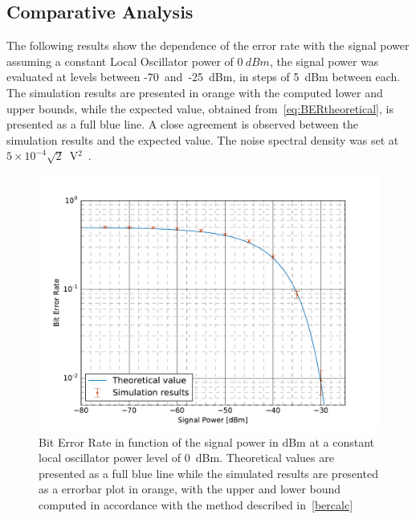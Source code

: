 \subsection{Comparative Analysis}

The following results show the dependence of the error rate with the signal power assuming a constant Local Oscillator power of $0~dBm$, the signal power was evaluated at levels between -70~and~-25~dBm, in steps of 5~dBm between each. The simulation results are presented in orange with the computed lower and upper bounds, while the expected value, obtained from~\eqref{eq:BERtheoretical}, is presented as a full blue line. A close agreement is observed between the simulation results and the expected value. The noise spectral density was set at $5\times10^{-4}\sqrt{2}$~V$^2$~\cite{thorlabs}.
\begin{figure}[H]
\centering
\includegraphics[width=.7\linewidth]{./sdf/bpsk_system/figures/BER_Evolution.pdf}
\caption{Bit Error Rate in function of the signal power in dBm at a constant local oscillator power level of 0~dBm. Theoretical values are presented as a full blue line while the simulated results are presented as a errorbar plot in orange, with the upper and lower bound computed in accordance with the method described in~\ref{bercalc}}
\label{fig:berevolution}
\end{figure}

\newpage



\renewcommand{\bibname}{References}
%


%
%


\cleardoublepage 